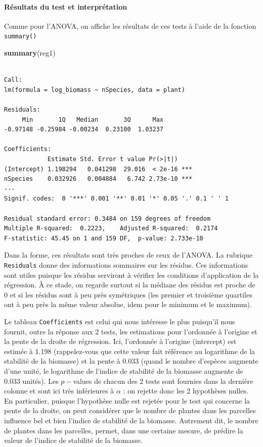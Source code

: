\documentclass[
  a4paper,
]{article}
\newenvironment{Shaded}{\begin{snugshade}}{\end{snugshade}}
\newcommand{\KeywordTok}[1]{\textcolor[rgb]{0.12,0.11,0.11}{\textbf{#1}}}
\newcommand{\NormalTok}[1]{\textcolor[rgb]{0.12,0.11,0.11}{#1}}
\begin{document}
\hypertarget{ruxe9sultats-du-test-et-interpruxe9tation-1}{%
\paragraph{Résultats du test et interprétation}\label{ruxe9sultats-du-test-et-interpruxe9tation-1}}

Comme pour l'ANOVA, on affiche les résultats de ces tests à l'aide de la fonction \texttt{summary()}

\begin{Shaded}
\begin{Highlighting}[]
\KeywordTok{summary}\NormalTok{(reg1)}
\end{Highlighting}
\end{Shaded}

\begin{verbatim}

Call:
lm(formula = log_biomass ~ nSpecies, data = plant)

Residuals:
     Min       1Q   Median       3Q      Max 
-0.97148 -0.25984 -0.00234  0.23100  1.03237 

Coefficients:
            Estimate Std. Error t value Pr(>|t|)    
(Intercept) 1.198294   0.041298  29.016  < 2e-16 ***
nSpecies    0.032926   0.004884   6.742 2.73e-10 ***
---
Signif. codes:  0 '***' 0.001 '**' 0.01 '*' 0.05 '.' 0.1 ' ' 1

Residual standard error: 0.3484 on 159 degrees of freedom
Multiple R-squared:  0.2223,    Adjusted R-squared:  0.2174 
F-statistic: 45.45 on 1 and 159 DF,  p-value: 2.733e-10
\end{verbatim}

Dans la forme, ces résultats sont très proches de ceux de l'ANOVA. La rubrique \texttt{Residuals} donne des informations sommaires sur les résidus. Ces informations sont utiles puisque les résidus serviront à vérifier les conditions d'application de la régression. À ce stade, on regarde surtout si la médiane des résidus est proche de 0 et si les résidus sont à peu près symétriques (les premier et troisième quartiles ont à peu près la même valeur absolue, idem pour le minimum et le maximum).

Le tableau \texttt{Coefficients} est celui qui nous intéresse le plus puisqu'il nous fournit, outre la réponse aux 2 tests, les estimations pour l'ordonnée à l'origine et la pente de la droite de régression. Ici, l'ordonnée à l'origine (intercept) est estimée à 1.198 (rappelez-vous que cette valeur fait référence au logarithme de la stabilité de la biomasse) et la pente à 0.033 (quand le nombre d'espèces augmente d'une unité, le logarithme de l'indice de stabilité de la biomasse augmente de 0.033 unités). Les \(p-\)values de chacun des 2 tests sont fournies dans la dernière colonne et sont ici très inférieures à \(\alpha\) : on rejette donc les 2 hypothèses nulles. En particulier, puisque l'hypothèse nulle est rejetée pour le test qui concerne la pente de la droite, on peut considérer que le nombre de plantes dans les parcelles influence bel et bien l'indice de stabilité de la biomasse. Autrement dit, le nombre de plantes dans les parcelles, permet, dans une certaine mesure, de prédire la valeur de l'indice de stabilité de la biomasse.
\end{document}
